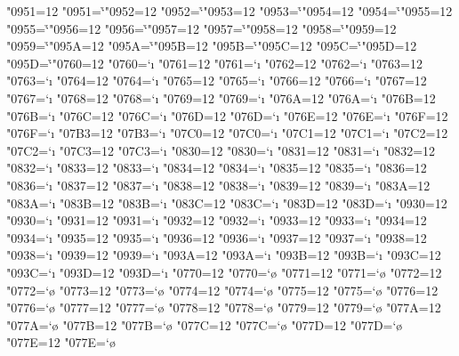 \catcode"0951=12 \lccode"0951=`\h
\catcode"0952=12 \lccode"0952=`\h
\catcode"0953=12 \lccode"0953=`\h
\catcode"0954=12 \lccode"0954=`\h
\catcode"0955=12 \lccode"0955=`\h
\catcode"0956=12 \lccode"0956=`\h
\catcode"0957=12 \lccode"0957=`\h
\catcode"0958=12 \lccode"0958=`\h
\catcode"0959=12 \lccode"0959=`\h
\catcode"095A=12 \lccode"095A=`\h
\catcode"095B=12 \lccode"095B=`\h
\catcode"095C=12 \lccode"095C=`\h
\catcode"095D=12 \lccode"095D=`\h
\catcode"0760=12 \lccode"0760=`\i
\catcode"0761=12 \lccode"0761=`\i
\catcode"0762=12 \lccode"0762=`\i
\catcode"0763=12 \lccode"0763=`\i
\catcode"0764=12 \lccode"0764=`\i
\catcode"0765=12 \lccode"0765=`\i
\catcode"0766=12 \lccode"0766=`\i
\catcode"0767=12 \lccode"0767=`\i
\catcode"0768=12 \lccode"0768=`\i
\catcode"0769=12 \lccode"0769=`\i
\catcode"076A=12 \lccode"076A=`\i
\catcode"076B=12 \lccode"076B=`\i
\catcode"076C=12 \lccode"076C=`\i
\catcode"076D=12 \lccode"076D=`\i
\catcode"076E=12 \lccode"076E=`\i
\catcode"076F=12 \lccode"076F=`\i
\catcode"07B3=12 \lccode"07B3=`\i
\catcode"07C0=12 \lccode"07C0=`\i
\catcode"07C1=12 \lccode"07C1=`\i
\catcode"07C2=12 \lccode"07C2=`\i
\catcode"07C3=12 \lccode"07C3=`\i
\catcode"0830=12 \lccode"0830=`\i
\catcode"0831=12 \lccode"0831=`\i
\catcode"0832=12 \lccode"0832=`\i
\catcode"0833=12 \lccode"0833=`\i
\catcode"0834=12 \lccode"0834=`\i
\catcode"0835=12 \lccode"0835=`\i
\catcode"0836=12 \lccode"0836=`\i
\catcode"0837=12 \lccode"0837=`\i
\catcode"0838=12 \lccode"0838=`\i
\catcode"0839=12 \lccode"0839=`\i
\catcode"083A=12 \lccode"083A=`\i
\catcode"083B=12 \lccode"083B=`\i
\catcode"083C=12 \lccode"083C=`\i
\catcode"083D=12 \lccode"083D=`\i
\catcode"0930=12 \lccode"0930=`\i
\catcode"0931=12 \lccode"0931=`\i
\catcode"0932=12 \lccode"0932=`\i
\catcode"0933=12 \lccode"0933=`\i
\catcode"0934=12 \lccode"0934=`\i
\catcode"0935=12 \lccode"0935=`\i
\catcode"0936=12 \lccode"0936=`\i
\catcode"0937=12 \lccode"0937=`\i
\catcode"0938=12 \lccode"0938=`\i
\catcode"0939=12 \lccode"0939=`\i
\catcode"093A=12 \lccode"093A=`\i
\catcode"093B=12 \lccode"093B=`\i
\catcode"093C=12 \lccode"093C=`\i
\catcode"093D=12 \lccode"093D=`\i
\catcode"0770=12 \lccode"0770=`\o
\catcode"0771=12 \lccode"0771=`\o
\catcode"0772=12 \lccode"0772=`\o
\catcode"0773=12 \lccode"0773=`\o
\catcode"0774=12 \lccode"0774=`\o
\catcode"0775=12 \lccode"0775=`\o
\catcode"0776=12 \lccode"0776=`\o
\catcode"0777=12 \lccode"0777=`\o
\catcode"0778=12 \lccode"0778=`\o
\catcode"0779=12 \lccode"0779=`\o
\catcode"077A=12 \lccode"077A=`\o
\catcode"077B=12 \lccode"077B=`\o
\catcode"077C=12 \lccode"077C=`\o
\catcode"077D=12 \lccode"077D=`\o
\catcode"077E=12 \lccode"077E=`\o

